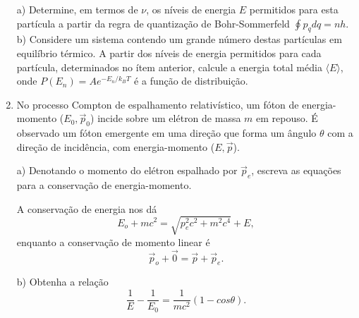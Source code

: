 \begin{enumerate}[start=1,label={\bfseries Q\arabic*.}]
a) Determine, em termos de $\nu$, os níveis de energia $E$ permitidos para esta partícula a partir da regra de quantização de Bohr-Sommerfeld $\oint p_{q} dq = nh$.
b) Considere um sistema contendo um grande número destas partículas em equilíbrio térmico. A partir dos níveis de energia permitidos para cada partícula, determinados no ítem anterior, calcule a energia total média $\langle E \rangle$, onde $P(E_{n}) = A e^{-E_{n} / k_{B}T}$ é a função de distribuição.





\item No processo Compton de espalhamento relativístico, um fóton de energia-momento ($E_{0}, \vec{p}_{0}$) incide sobre um elétron de massa $m$ em repouso. É observado um fóton emergente em uma direção que forma um ângulo $\theta$ com a direção de incidência, com energia-momento ($E, \vec{p}$).


a) Denotando o momento do elétron espalhado por $\vec{p}_{e}$, escreva as equações para a conservação de energia-momento.

\resposta A conservação de energia nos dá
%
\begin{equation}\label{eq7}
  E_{o} + m c^{2} = \sqrt{p_{e}^{2} c^{2} + m^{2} c^{4}} + E ,
\end{equation}
%
enquanto a conservação de momento linear é
%
\begin{equation}
  \vec{p}_{o} + \vec{0} = \vec{p} + \vec{p}_{e} .
\end{equation}



b) Obtenha a relação
$$
\frac{1}{E} - \frac{1}{E_{0}} = \frac{1}{mc^{2}} (1 - cos \theta).
$$


\end{enumerate}

